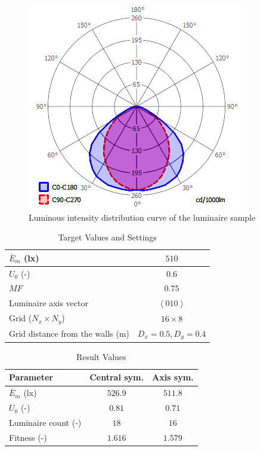 \begin{figure}[htb]
  \centering
  \includegraphics[width=0.7\columnwidth]{IDiag}
  \caption{Luminous intensity distribution curve of the luminaire sample}
  \label{fig:IDiag}
\end{figure}

\begin{table}[htb]
	\renewcommand{\arraystretch}{1.3}
	\caption{Target Values and Settings}
 	\label{tab:trgVal}
	\centering
  \begin{tabular}{| l | c |}
    \hline
    $\overline{E}_{m}$ (lx) & $510$ \\
    \hline
    $U_{0}$ (-) & $0.6$ \\
    \hline
		$MF$ & $0.75$ \\
    \hline
		Luminaire axis vector & $\left\langle 010\right\rangle$ \\
    \hline
		Grid ($N_x \times N_y$) & $16 \times 8$ \\
    \hline
		Grid distance from the walls (m) & $D_x=0.5, D_y=0.4$ \\
    \hline
  \end{tabular}
\end{table}

\begin{table}[htb]
	\renewcommand{\arraystretch}{1.3}
	\caption{Result Values}
 	\label{tab:resVal}
	\centering
  \begin{tabular}{| l | c | c |}
	  \hline
	  \textbf{Parameter} & \textbf{Central sym.} & \textbf{Axis sym.}\\
    \hline
    $\overline{E}_{m}$ (lx) & $526.9$ & $511.8$ \\
    \hline
    $U_{0}$ (-) & $0.81$ & $0.71$ \\
    \hline
		Luminaire count (-) & $18$ & $16$ \\
    \hline
		Fitness (-) & $1.616$ & $1.579$ \\
    \hline
  \end{tabular}
\end{table}

